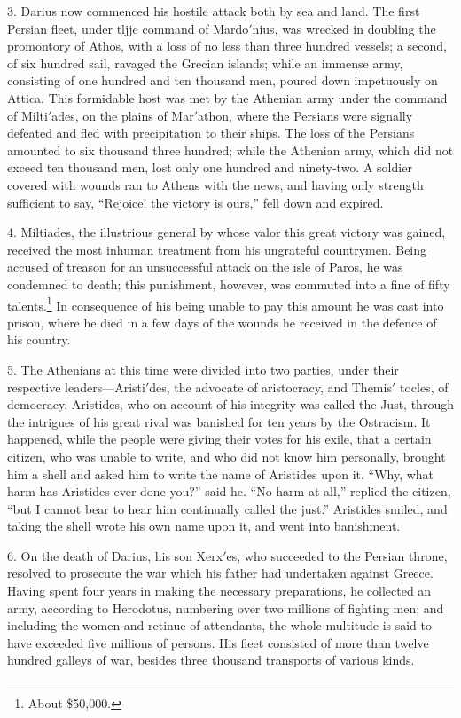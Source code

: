 \documentclass[openany,a4paper]{memoir}
\begin{document}
3. Darius now commenced his hostile attack both by sea 
and land. The first Persian fleet, under tljje command of 
Mardo$'$nius, was wrecked in doubling the promontory of 
Athos, with a loss of no less than three hundred vessels; a 
second, of six hundred sail, ravaged the Grecian islands; 
while an immense army, consisting of one hundred and ten 
thousand men, poured down impetuously on Attica. This 
formidable host was met by the Athenian army under the 
command of Milti$'$ades, on the plains of Mar$'$athon, where 
the Persians were signally defeated and fled with precipitation to their ships. The loss of the Persians amounted to 
six thousand three hundred; while the Athenian army, which 
did not exceed ten thousand men, lost only one hundred and 
ninety-two. A soldier covered with wounds ran to Athens 
with the news, and having only strength sufficient to say, 
``Rejoice! the victory is ours,'' fell down and expired. 

4. Miltiades, the illustrious general by whose valor this 
great victory was gained, received the most inhuman treatment from his ungrateful countrymen. Being accused of 
treason for an unsuccessful attack on the isle of Paros, he 
was condemned to death; this punishment, however, was commuted into a fine of fifty talents.\footnote{About \$50,000.} In consequence of his 
being unable to pay this amount he was cast into prison, 
where he died in a few days of the wounds he received in the 
defence of his country. 

5. The Athenians at this time were divided into two parties, under their respective leaders---Aristi$'$des, the advocate 
of aristocracy, and Themis$'$ tocles, of democracy. Aristides, 
who on account of his integrity was called the Just, through 
the intrigues of his great rival was banished for ten years 
by the Ostracism. It happened, while the people were giving 
their votes for his exile, that a certain citizen, who was unable to write, and who did not know him personally, brought 
him a shell and asked him to write the name of Aristides 
upon it. ``Why, what harm has Aristides ever done you?''
said he. ``No harm at all,'' replied the citizen, ``but I cannot bear to hear him continually called the just.'' Aristides 
smiled, and taking the shell wrote his own name upon it, 
and went into banishment. 

6. On the death of Darius, his son Xerx$'$es, who succeeded 
to the Persian throne, resolved to prosecute the war which 
his father had undertaken against Greece. Having spent four 
years in making the necessary preparations, he collected an 
army, according to Herodotus, numbering over two millions 
of fighting men; and including the women and retinue of attendants, the whole multitude is said to have exceeded five 
millions of persons. His fleet consisted of more than twelve 
hundred galleys of war, besides three thousand transports of 
various kinds. 
\end{document}
